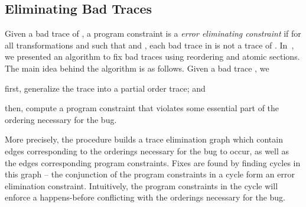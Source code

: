 \documentclass{llncs}
\begin{document}
\subsection{Eliminating Bad Traces}
\label{sec:fix_bad}



Given a bad trace  of , a program constraint 
is a {\em error eliminating constraint} if for all transformations
 and  such that 
 and , each bad trace
 in  is not a
trace of .
In~\cite{cav2013}, we presented an algorithm to fix bad traces using
reordering and atomic sections.
The main idea behind the algorithm is as follows.
Given a bad trace , we 
\begin{inparaenum}[(a)]
\item first, generalize the trace into a partial order trace; and
\item then, compute a program constraint that violates some essential
  part of the ordering necessary for the bug. 
\end{inparaenum}

More precisely, the procedure builds a trace elimination graph which
contain edges corresponding to the orderings necessary for the
bug to occur, as well as the edges corresponding program constraints.
Fixes are found by finding cycles in this graph -- the conjunction of
the program constraints in a cycle form an error elimination constraint.
Intuitively, the program constraints in the cycle will enforce a
happens-before conflicting with the orderings necessary for the bug.
\end{document}
